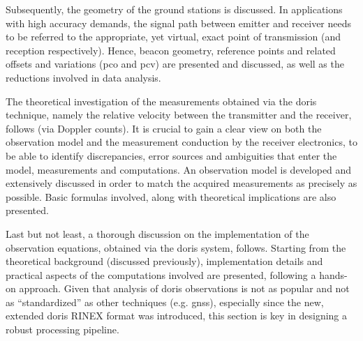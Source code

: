 Subsequently, the geometry of the ground stations is discussed. In applications  
with high accuracy demands, the signal path between emitter and receiver  
needs to be referred to the appropriate, yet virtual, exact point of transmission 
(and reception respectively). Hence, beacon geometry, reference points and related 
offsets and variations (\gls{pco} and \gls{pcv}) are presented and discussed, as 
well as the reductions involved in data analysis.

The theoretical investigation of the measurements obtained via the \gls{doris} 
technique, namely the relative velocity between the transmitter and the receiver, 
follows (via Doppler counts).
It is crucial to gain a clear view on both the 
observation model and the measurement conduction by the receiver electronics, to 
be able to identify discrepancies, error sources and ambiguities that enter the model, 
measurements and computations. An observation model is developed and extensively 
discussed in order to match the acquired measurements as precisely as possible. 
Basic formulas involved, along with theoretical implications are also presented.

Last but not least, a thorough discussion on the implementation of the observation 
equations, obtained via the \gls{doris} system, follows. Starting from the theoretical 
background (discussed previously), implementation details and practical aspects of the 
computations involved are presented, following a hands-on approach. Given that analysis 
of \gls{doris} observations is not as popular and not as ``standardized'' as other 
techniques (e.g. \gls{gnss}), especially since the new, extended \gls{doris} RINEX 
format was introduced, this section is key in designing a robust processing pipeline.
